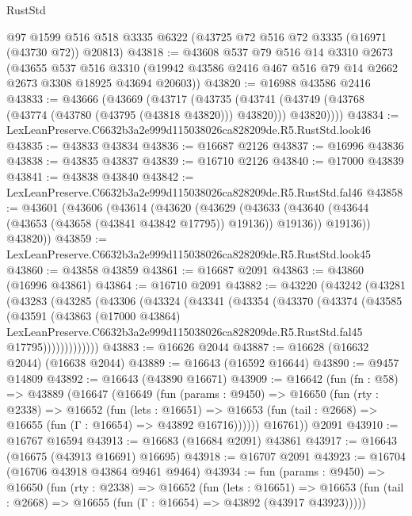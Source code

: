 \begin{lexlean}{RustStd}
\begin{coremodule}
    @97
    @1599
    @516
    @518
    @3335
    @6322
    (@43725 @72 @516 @72 @3335 (@16971 (@43730 @72)) @20813)
@43818 := @43608
    @537
    @79
    @516
    @14
    @3310
    @2673
    (@43655
      @537
      @516
      @3310
      (@19942 @43586 @2416 @467 @516 @79 @14 @2662 @2673 @3308 @18925 @43694 @20603))
@43820 := @16988 @43586 @2416
@43833 := @43666
    (@43669
      (@43717
        (@43735
          (@43741 (@43749 (@43768 (@43774 (@43780 (@43795 (@43818 @43820))) @43820))) @43820))))
@43834 := LexLeanPreserve.C6632b3a2e999d115038026ca828209de.R5.RustStd.look46
@43835 := @43833 @43834
@43836 := @16687 @2126
@43837 := @16996 @43836
@43838 := @43835 @43837
@43839 := @16710 @2126
@43840 := @17000 @43839
@43841 := @43838 @43840
@43842 := LexLeanPreserve.C6632b3a2e999d115038026ca828209de.R5.RustStd.fal46
@43858 := @43601
    (@43606
      (@43614
        (@43620
          (@43629
            (@43633 (@43640 (@43644 (@43653 (@43658 (@43841 @43842 @17795)) @19136)) @19136))
            @19136))
        @43820))
@43859 := LexLeanPreserve.C6632b3a2e999d115038026ca828209de.R5.RustStd.look45
@43860 := @43858 @43859
@43861 := @16687 @2091
@43863 := @43860 (@16996 @43861)
@43864 := @16710 @2091
@43882 := @43220
    (@43242
      (@43281
        (@43283
          (@43285
            (@43306
              (@43324
                (@43341
                  (@43354
                    (@43370
                      (@43374
                        (@43585
                          (@43591
                            (@43863
                              (@17000 @43864)
                              LexLeanPreserve.C6632b3a2e999d115038026ca828209de.R5.RustStd.fal45
                              @17795)))))))))))))
@43883 := @16626 @2044
@43887 := @16628 (@16632 @2044) (@16638 @2044)
@43889 := @16643 (@16592 @16644)
@43890 := @9457 @14809
@43892 := @16643 (@43890 @16671)
@43909 := @16642
    (fun (fn : @58) =>
    @43889
      (@16647
        (@16649
          (fun (params : @9450) =>
          @16650
            (fun (rty : @2338) =>
            @16652
              (fun (lets : @16651) =>
              @16653 (fun (tail : @2668) => @16655 (fun (Γ : @16654) => @43892 @16716))))))
        @16761))
    @2091
@43910 := @16767 @16594
@43913 := @16683 (@16684 @2091) @43861
@43917 := @16643 (@16675 (@43913 @16691) @16695)
@43918 := @16707 @2091
@43923 := @16704 (@16706 @43918 @43864 @9461 @9464)
@43934 := fun (params : @9450) =>
  @16650
    (fun (rty : @2338) =>
    @16652
      (fun (lets : @16651) =>
      @16653 (fun (tail : @2668) => @16655 (fun (Γ : @16654) => @43892 (@43917 @43923)))))

\end{coremodule}
\end{lexlean}
